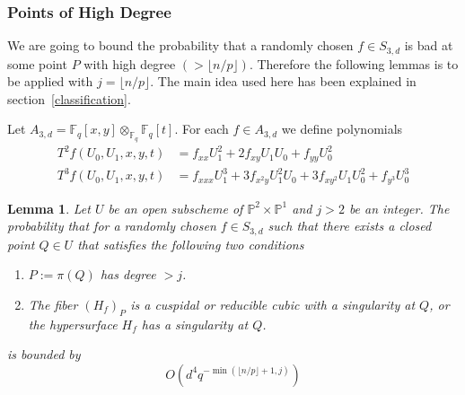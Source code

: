 \documentclass[12pt]{article}
\theoremstyle{plain}
\newtheorem{lemma}[equation]{Lemma}
\theoremstyle{definition}
\newcommand{\IF}{\mathbb{F}}
\newcommand{\IP}{\mathbb{P}}
\newcommand{\sB}{\mathcal{B}}
\newcommand\tensor{{\otimes}}
\newcommand\union{\bigcup}
\newcommand{\<}{\langle}
\renewcommand{\>}{\rangle}
\begin{document}
\subsubsection{Points of High Degree}
We are going to bound the probability that a randomly chosen $f \in S_{3, d}$ is bad at some point $P$ with high degree $(> \lfloor n/p \rfloor)$. Therefore the following lemmas is to be applied with $j = \lfloor n/p \rfloor$. The main idea used here has been explained in section~\ref{classification}.

Let $A_{3, d} = \IF_q[x, y]\tensor_{\IF_q} \IF_q[t]$. 
For each $f \in A_{3, d}$ we define polynomials
\begin{align*}
T^2 f(U_0, U_1, x, y, t) &= f_{xx}U_1^2 + 2f_{xy} U_1 U_0 + f_{yy} U_0^2 \\
T^3 f(U_0, U_1, x, y, t) &= f_{xxx} U_1^3 + 3 f_{x^2 y} U_1^2 U_0 + 3 f_{x y^2} U_1 U_0^2 + f_{y^3} U_0^3 
\end{align*}


\begin{lemma}
\label{elliptichigh}
Let $U$ be an open subscheme of $\IP^2 \times \IP^1$ and $j > 2$ be an integer. The probability that for a randomly chosen $f \in S_{3, d}$ such that there exists a closed point $Q \in U$ that satisfies the following two conditions
\begin{enumerate}
\item $P := \pi(Q)$ has degree $> j$. 
\item The fiber $(H_f)_P$ is a cuspidal or reducible cubic with a singularity at $Q$, or the hypersurface $H_f$ has a singularity at $Q$. 
\end{enumerate}
is bounded by 
$$ O(d^4 q^{-\min(\lfloor n/p \rfloor + 1, j)}) $$
\end{lemma}
\end{document}
